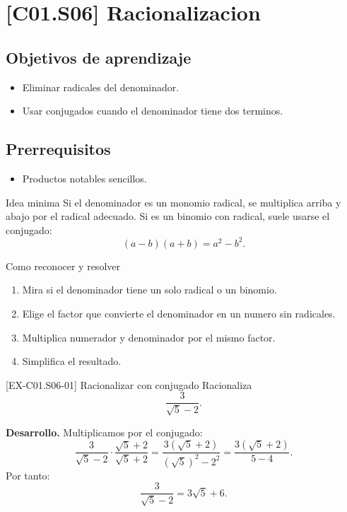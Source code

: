 \section{[C01.S06] Racionalizacion}

\subsection*{Objetivos de aprendizaje}
\begin{itemize}
  \item Eliminar radicales del denominador.
  \item Usar conjugados cuando el denominador tiene dos terminos.
\end{itemize}

\subsection*{Prerrequisitos}
\begin{itemize}
  \item Productos notables sencillos.
\end{itemize}

\begin{theorybox}{Idea minima}
Si el denominador es un monomio radical, se multiplica arriba y abajo por el radical adecuado.
Si es un binomio con radical, suele usarse el conjugado:
\[
(a-b)(a+b)=a^2-b^2.
\]
\end{theorybox}

\begin{methodbox}{Como reconocer y resolver}
\begin{enumerate}
  \item Mira si el denominador tiene un solo radical o un binomio.
  \item Elige el factor que convierte el denominador en un numero sin radicales.
  \item Multiplica numerador y denominador por el mismo factor.
  \item Simplifica el resultado.
\end{enumerate}
\end{methodbox}

\begin{solvedexample}{[EX-C01.S06-01] Racionalizar con conjugado}
Racionaliza
\[
\frac{3}{\sqrt{5}-2}.
\]

\textbf{Desarrollo.} Multiplicamos por el conjugado:
\[
\frac{3}{\sqrt{5}-2}\cdot\frac{\sqrt{5}+2}{\sqrt{5}+2}
=\frac{3(\sqrt{5}+2)}{(\sqrt{5})^2-2^2}
=\frac{3(\sqrt{5}+2)}{5-4}.
\]
Por tanto:
\[
\frac{3}{\sqrt{5}-2}=3\sqrt{5}+6.
\]
\end{solvedexample}

